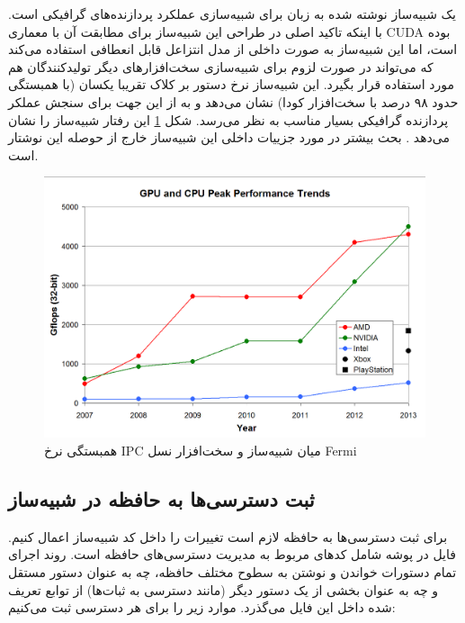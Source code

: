 \documentclass{thesis}
\begin{document}
یک شبیه‌ساز نوشته شده به زبان
برای شبیه‌سازی عملکرد پردازنده‌های گرافیکی 
است. با اینکه تاکید اصلی در طراحی این شبیه‌ساز برای مطابقت آن با معماری
CUDA
بوده است، اما این شبیه‌ساز به صورت داخلی از مدل انتزاعل قابل  انعطافی استفاده
می‌کند
که می‌تواند در صورت لزوم برای شبیه‌سازی سخت‌افزار‌های دیگر تولید‌کنندگان هم
مورد استفاده قرار بگیرد.
این شبیه‌ساز نرخ دستور بر کلاک
تقریبا یکسان
(با همبستگی حدود ۹۸ درصد با سخت‌افزار کودا) نشان می‌دهد و به از این جهت برای
سنجش عملکر پردازنده گرافیکی بسیار مناسب به نظر می‌رسد.
شکل
\ref{ipccorrelation}
این رفتار شبیه‌ساز را نشان می‌دهد
.
 بحث بیشتر در مورد جزییات داخلی این شبیه‌ساز خارج از
حوصله این نوشتار است.

\begin{figure}[h]
\centering
\includegraphics[width=\textwidth]{./pics/6}
\caption{همبستگی نرخ 
IPC
میان شبیه‌ساز و سخت‌افزار نسل
Fermi
}
\label{ipccorrelation}
\end{figure}

\subsection{
ثبت دسترسی‌ها به حافظه در شبیه‌ساز
}

برای ثبت دسترسی‌ها به حافظه لازم است تغییرات را داخل کد شبیه‌ساز اعمال کنیم.
فایل
در پوشه
شامل کد‌های مربوط به مدیریت دسترسی‌های حافظه است. روند اجرای تمام دستورات
خواندن
و 
نوشتن
به سطوح مختلف حافظه، چه به عنوان دستور مستقل و چه به عنوان بخشی از یک دستور
دیگر (مانند دسترسی به ثبات‌ها)
از توابع تعریف شده داخل این فایل می‌گذرد. موارد زیر را برای هر دسترسی ثبت
می‌کنیم:
\end{document}
